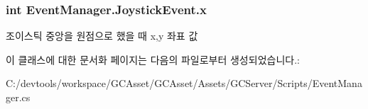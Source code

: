 \subsubsection[{x}]{\setlength{\rightskip}{0pt plus 5cm}int Event\+Manager.\+Joystick\+Event.\+x}\label{class_event_manager_1_1_joystick_event_a46fa188ab73a143068f0db144189258c}
조이스틱 중앙을 원점으로 했을 때 x,y 좌표 값 

이 클래스에 대한 문서화 페이지는 다음의 파일로부터 생성되었습니다.\+:\begin{DoxyCompactItemize}
\item 
C\+:/devtools/workspace/\+G\+C\+Asset/\+G\+C\+Asset/\+Assets/\+G\+C\+Server/\+Scripts/Event\+Manager.\+cs\end{DoxyCompactItemize}
